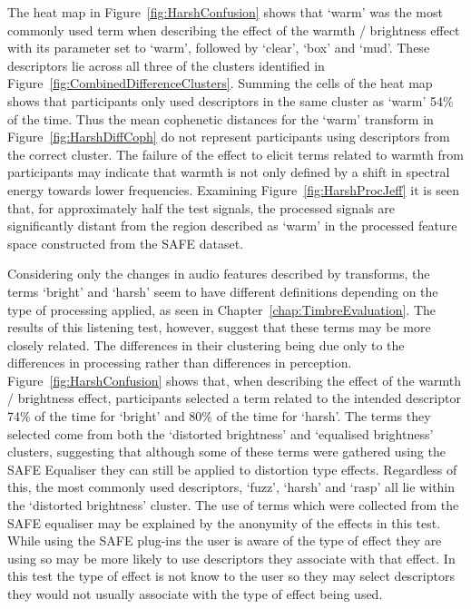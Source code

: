 			The heat map in Figure~\ref{fig:HarshConfusion} shows that `warm' was the most commonly used term
			when describing the effect of the warmth / brightness effect with its parameter set to `warm',
			followed by `clear', `box' and `mud'. These descriptors lie across all three of the clusters
			identified in Figure~\ref{fig:CombinedDifferenceClusters}. Summing the cells of the heat map shows
			that participants only used descriptors in the same cluster as `warm' 54\% of the time. Thus the
			mean cophenetic distances for the `warm' transform in Figure~\ref{fig:HarshDiffCoph} do not
			represent participants using descriptors from the correct cluster. The failure of the effect to
			elicit terms related to warmth from participants may indicate that warmth is not only defined by a
			shift in spectral energy towards lower frequencies. Examining Figure~\ref{fig:HarshProcJeff} it is
			seen that, for approximately half the test signals, the processed signals are significantly distant
			from the region described as `warm' in the processed feature space constructed from the SAFE
			dataset.
			
			Considering only the changes in audio features described by transforms, the terms `bright' and
			`harsh' seem to have different definitions depending on the type of processing applied, as seen in
			Chapter~\ref{chap:TimbreEvaluation}. The results of this listening test, however, suggest that
			these terms may be more closely related. The differences in their clustering being due only to the
			differences in processing rather than differences in perception. Figure~\ref{fig:HarshConfusion}
			shows that, when describing the effect of the warmth / brightness effect, participants selected a
			term related to the intended descriptor 74\% of the time for `bright' and 80\% of the time for
			`harsh'. The terms they selected come from both the `distorted brightness' and `equalised
			brightness' clusters, suggesting that although some of these terms were gathered using the SAFE
			Equaliser they can still be applied to distortion type effects. Regardless of this, the most
			commonly used descriptors, `fuzz', `harsh' and `rasp' all lie within the `distorted brightness'
			cluster. The use of terms which were collected from the SAFE equaliser may be explained by the
			anonymity of the effects in this test. While using the SAFE plug-ins the user is aware of the type
			of effect they are using so may be more likely to use descriptors they associate with that effect.
			In this test the type of effect is not know to the user so they may select descriptors they would
			not usually associate with the type of effect being used.

